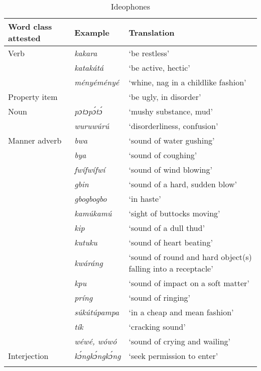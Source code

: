 \begin{table}
\caption{Ideophones}
\label{tab:key:12.1}

\begin{tabularx}{\textwidth}{llQ}
\lsptoprule

Word class attested & Example & Translation\\
\midrule 
Verb & \itshape kakara & ‘be restless’\\
& \itshape katakátá & ‘be active, hectic’\\
& \itshape ményéményé & ‘whine, nag in a childlike fashion’\\

\tablevspace
Property item & \itshape {} & ‘be ugly, in disorder’\\

\tablevspace
Noun & \itshape pɔtɔpɔ́tɔ́ & ‘mushy substance, mud’\\
& \itshape wuruwúrú & ‘disorderliness, confusion’\\

\tablevspace
Manner adverb & \itshape bwa & ‘sound of water gushing’\\
& \itshape bya & ‘sound of coughing’\\
& \itshape fwífwífwí & ‘sound of wind blowing’\\
& \itshape gbin & ‘sound of a hard, sudden blow’\\
& \itshape gbogbogbo & ‘in haste’\\
& \itshape kamúkamú & ‘sight of buttocks moving’\\
& \itshape kip & ‘sound of a dull thud’\\
& \itshape kutuku & ‘sound of heart beating’\\
& \itshape kwáráng & ‘sound of round and hard object(s) falling into a receptacle’\\
& \itshape kpu & ‘sound of impact on a soft matter’\\
& \itshape príng & ‘sound of ringing’\\
& \itshape súkútúpampa & ‘in a cheap and mean fashion’\\
& \itshape tík & ‘cracking sound’\\
& \itshape wéwé, wówó & ‘sound of crying and wailing’\\

\tablevspace
Interjection & \itshape kɔ́ngkɔ́ngkɔ́ng & ‘seek permission to enter’\\
\lspbottomrule
\end{tabularx}
\end{table}

